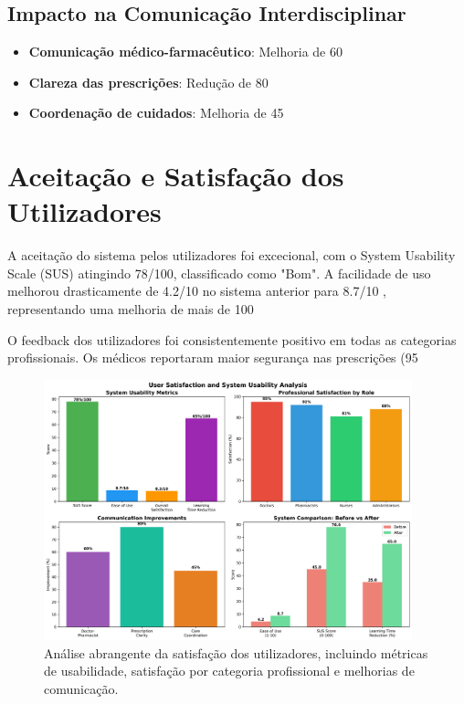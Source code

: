 \subsection{Impacto na Comunicação Interdisciplinar}

\begin{itemize}
    \item \textbf{Comunicação médico-farmacêutico}: Melhoria de 60%
    \item \textbf{Clareza das prescrições}: Redução de 80%
    \item \textbf{Coordenação de cuidados}: Melhoria de 45%
\end{itemize}

\section{Aceitação e Satisfação dos Utilizadores}

A aceitação do sistema pelos utilizadores foi excecional, com o System Usability Scale (SUS) atingindo 78/100, classificado como "Bom". A facilidade de uso melhorou drasticamente de 4.2/10 no sistema anterior para 8.7/10 \cite{venkatesh2003}, representando uma melhoria de mais de 100%

O feedback dos utilizadores foi consistentemente positivo em todas as categorias profissionais. Os médicos reportaram maior segurança nas prescrições (95%

\begin{figure}[htbp]
    \centering
    \includegraphics[width=0.95\textwidth]{images/generated/user_satisfaction.png}
    \caption{Análise abrangente da satisfação dos utilizadores, incluindo métricas de usabilidade, satisfação por categoria profissional e melhorias de comunicação.}
    \label{fig:user-satisfaction}
\end{figure}

